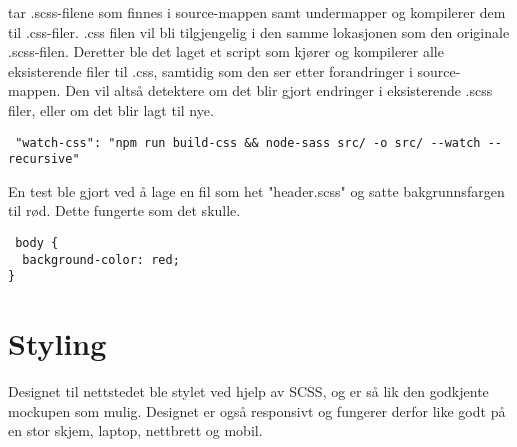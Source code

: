  tar .scss-filene som finnes i source-mappen samt undermapper og kompilerer dem til .css-filer. .css filen vil bli tilgjengelig i den samme lokasjonen som den originale .scss-filen. Deretter ble det laget et script som kjører  og kompilerer alle eksisterende filer til .css, samtidig som den ser etter forandringer i source-mappen. Den vil altså detektere om det blir gjort endringer i eksisterende .scss filer, eller om det blir lagt til nye. 

\begin{lstlisting}
 "watch-css": "npm run build-css && node-sass src/ -o src/ --watch --recursive"
\end{lstlisting}

En test ble gjort ved å lage en fil som het "header.scss" og satte bakgrunnsfargen til rød. Dette fungerte som det skulle.

\begin{lstlisting}
 body {
  background-color: red;
}
\end{lstlisting}

\section{Styling}
Designet til nettstedet ble stylet ved hjelp av SCSS, og er så lik den godkjente mockupen som mulig. Designet er også responsivt og fungerer derfor like godt på en stor skjem, laptop, nettbrett og mobil.






